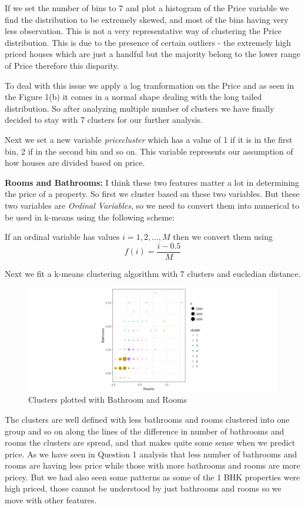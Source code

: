 \documentclass[]{article}
\begin{document}
If we set the number of bins to 7 and plot a histogram of the Price
variable we find the distribution to be extremely skewed, and most of
the bins having very less observation. This is not a very representative
way of clustering the Price distribution. This is due to the presence of
certain outliers - the extremely high priced houses which are just a
handful but the majority belong to the lower range of Price therefore
this disparity.

To deal with this issue we apply a log tranformation on the Price and as
seen in the Figure 1(b) it comes in a normal shape dealing with the long
tailed distribution. So after analyzing multiple number of clusters we
have finally decided to stay with 7 clusters for our further analysis.

Next we set a new variable \emph{pricecluster} which has a value of 1 if
it is in the first bin, 2 if in the second bin and so on. This variable
represents our assumption of how houses are divided based on price.

\textbf{Rooms and Bathrooms:} I think these two features matter a lot in
determining the price of a property. So first we cluster based on these
two variables. But these two variables are \emph{Ordinal Variables}, so
we need to convert them into numerical to be used in k-means using the
following scheme:

If an ordinal variable has values \(i = 1,2,...,M\) then we convert them
using \[f(i) = \frac{i - 0.5}{M}\]

Next we fit a k-means clustering algorithm with 7 clusters and eucledian
distance.

\begin{figure}
\centering
\includegraphics{Report_files/figure-latex/unnamed-chunk-8-1.pdf}
\caption{Clusters plotted with Bathroom and Rooms}
\end{figure}

The clusters are well defined with less bathrooms and rooms clustered
into one group and so on along the lines of the difference in number of
bathrooms and rooms the clusters are spread, and that makes quite some
sense when we predict price. As we have seen in Question 1 analysis that
less number of bathrooms and rooms are having less price while those
with more bathrooms and rooms are more pricey. But we had also seen some
patterns as some of the 1 BHK properties were high priced, those cannot
be understood by just bathrooms and rooms so we move with other
features.
\end{document}
